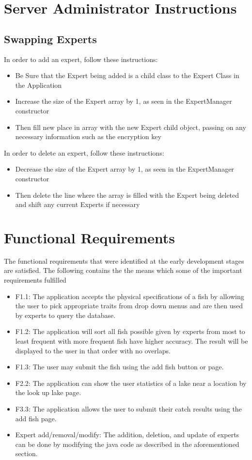 \documentclass{article}
\begin{document}
\section{Server Administrator Instructions}

\subsection{Swapping Experts}
In order to add an expert, follow these instructions:
\begin{itemize} 
	\item Be Sure that the Expert being added is a child class to the Expert Class in the Application
	\item Increase the size of the Expert array by 1, as seen in the ExpertManager constructor
	\item Then fill new place in array with the new Expert child object, passing on any necessary information such as the encryption key
\end{itemize}
In order to delete an expert, follow these instructions:
\begin{itemize} 
	\item Decrease the size of the Expert array by 1, as seen in the ExpertManager constructor
	\item Then delete the line where the array is filled with the Expert being deleted and shift any current Experts if necessary 
\end{itemize}

\section{Functional Requirements}
The functional requirements that were identified at the early development stages are satisfied.
The following contains the the means which some of the important requirements fulfilled
\begin{itemize} 
	\item F1.1: The application accepts the physical specifications of a fish by allowing the user to pick appropriate traits from
	drop down menus and are then used by experts to query the database.
	\item F1.2: The application will sort all fish possible given by experts from most to least frequent with more frequent fish have higher
	accuracy. The result will be displayed to the user in that order with no overlaps.
	\item F1.3: The user may submit the fish using the add fish button or page.
	\item F2.2: The application can show the user statistics of a lake near a location by the look up lake page.
	\item F3.3: The application allows the user to submit their catch results using the add fish page.
	\item Expert add/removal/modify: The addition, deletion, and update of experts can be done by modifying the java code as
	described in the aforementioned section.
\end{itemize}

\newpage
\listoffigures
\end{document}
